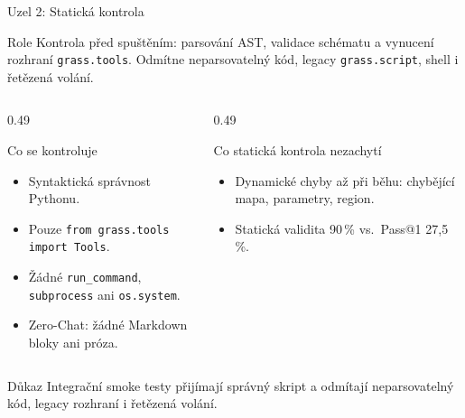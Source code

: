 \documentclass[aspectratio=169,10pt]{beamer}
\begin{document}
\begin{frame}[t]{Uzel 2: Statická kontrola}
  \small
  \begin{block}{Role}
    Kontrola před spuštěním: parsování AST, validace schématu a vynucení
    rozhraní \texttt{grass.tools}. Odmítne neparsovatelný kód, legacy
    \texttt{grass.script}, shell i řetězená volání.
  \end{block}

  \begin{columns}[T,onlytextwidth]
    \begin{column}{0.49\textwidth}
      \begin{block}{Co se kontroluje}
        \begin{itemize}
          \item Syntaktická správnost Pythonu.
          \item Pouze \texttt{from grass.tools import Tools}.
          \item Žádné \texttt{run\_command}, \texttt{subprocess} ani \texttt{os.system}.
          \item Zero-Chat: žádné Markdown bloky ani próza.
        \end{itemize}
      \end{block}
    \end{column}
    \begin{column}{0.49\textwidth}
      \begin{block}{Co statická kontrola nezachytí}
        \begin{itemize}
          \item Dynamické chyby až při běhu: chybějící mapa, parametry, region.
          \item Statická validita 90\,\% vs.\ Pass@1 27{,}5\,\%.
        \end{itemize}
      \end{block}
    \end{column}
  \end{columns}

  \begin{alertblock}{Důkaz}
    Integrační smoke testy přijímají správný skript a odmítají neparsovatelný
    kód, legacy rozhraní i řetězená volání.
  \end{alertblock}
\end{frame}
\end{document}
